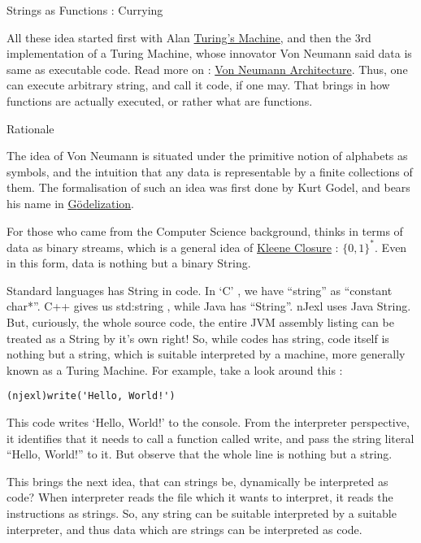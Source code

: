 \begin{section}{Strings as Functions : Currying}

All these idea started first with 
Alan \href{https://en.wikipedia.org/wiki/Turing\_machine}{Turing's Machine}, 
and then the 3rd implementation of a Turing Machine, whose innovator Von Neumann said data is same as executable code. Read more on : 
\href{https://en.wikipedia.org/wiki/Von\_Neumann\_architecture}{Von Neumann Architecture}.
Thus, one can execute arbitrary string, and call it code, if one may. That brings in how functions are actually executed, or rather what are functions.

\begin{subsection}{Rationale}

The idea of Von Neumann is situated under the primitive notion of alphabets as symbols, and the intuition that any data is representable by a finite collections of them. The formalisation of such an idea was first done by Kurt Godel, and bears his name in 
\href{http://demonstrations.wolfram.com/Goedelization/}{G{\"o}delization}. 

For those who came from the Computer Science background, thinks in terms of data as binary streams, which is a general idea of 
\href{https://en.wikipedia.org/wiki/Kleene\_star}{Kleene Closure} : $\{0,1\}^*$. 
Even in this form, data is nothing but a binary String.

Standard languages has String in code. In `C' , we have ``string'' as ``constant char*''. C++ gives us std:string , 
while Java has ``String''. nJexl uses Java String. But, curiously, the whole source code, the entire JVM assembly listing can be treated as a String by it's own right! So, while codes has string, code itself is nothing but a string, which is suitable interpreted by a machine, more generally known as a Turing Machine. For example, take a look around this :

\begin{lstlisting}[style=all]
 (njexl)write('Hello, World!')
\end{lstlisting}

This code writes `Hello, World!' to the console. From the interpreter perspective, it identifies that it needs to call a function called write, and pass the string literal ``Hello, World!'' to it. But observe that the whole line is nothing but a string.

This brings the next idea, that can strings be, dynamically be interpreted as code? When interpreter reads the file which it wants to interpret, it reads the instructions as strings. So, any string can be suitable interpreted by a suitable interpreter, and thus data which are strings can be interpreted as code.


\end{subsection}
\end{section}
